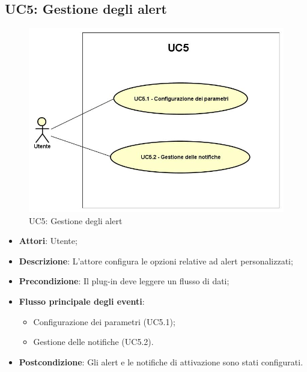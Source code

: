 \subsection{UC5: Gestione degli alert}
\hypertarget{UC5}{}
\begin{figure} [H]
 	\centering
 	\includegraphics[scale=0.45]{Img/UC5}
 	\caption{UC5: Gestione degli alert}\label{}
\end{figure}
\begin{itemize}
	\item \textbf{Attori}: Utente;
	\item \textbf{Descrizione}: L'attore configura le opzioni relative ad alert personalizzati;
	\item \textbf{Precondizione}: Il plug-in deve leggere un flusso di dati;
	\item \textbf{Flusso principale degli eventi}:
		\begin{itemize}
			\item Configurazione dei parametri (UC5.1);
			\item Gestione delle notifiche (UC5.2).
		\end{itemize}
	\item \textbf{Postcondizione}: Gli alert e le notifiche di attivazione sono stati configurati.
\end{itemize}

